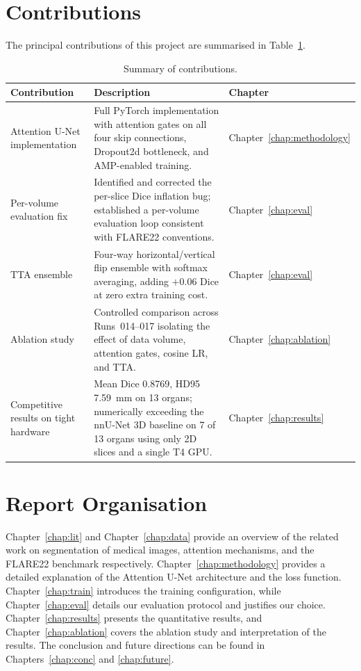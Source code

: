 \section{Contributions}

The principal contributions of this project are summarised in Table~\ref{tab:contributions}.

\begin{table}[h!]
\centering
\caption{Summary of contributions.}
\label{tab:contributions}
\begin{tabular}{p{3.5cm} p{7cm} p{2.5cm}}
\toprule
\textbf{Contribution} & \textbf{Description} & \textbf{Chapter} \\
\midrule
Attention U-Net implementation &
  Full PyTorch implementation with attention gates on all four skip connections, Dropout2d
  bottleneck, and AMP-enabled training. &
  Chapter~\ref{chap:methodology} \\[6pt]
Per-volume evaluation fix &
  Identified and corrected the per-slice Dice inflation bug; established a per-volume evaluation
  loop consistent with FLARE22 conventions. &
  Chapter~\ref{chap:eval} \\[6pt]
TTA ensemble &
  Four-way horizontal/vertical flip ensemble with softmax averaging, adding $+$0.06 Dice at zero
  extra training cost. &
  Chapter~\ref{chap:eval} \\[6pt]
Ablation study &
  Controlled comparison across Runs~014--017 isolating the effect of data volume, attention gates,
  cosine LR, and TTA. &
  Chapter~\ref{chap:ablation} \\[6pt]
Competitive results on tight hardware &
  Mean Dice 0.8769, HD95 7.59~mm on 13 organs; numerically exceeding the nnU-Net 3D baseline
  on 7 of 13 organs using only 2D slices and a single T4 GPU. &
  Chapter~\ref{chap:results} \\
\bottomrule
\end{tabular}
\end{table}

\section{Report Organisation}

Chapter~\ref{chap:lit} and Chapter~\ref{chap:data} provide an overview of the related work on segmentation of medical images, attention mechanisms, and the FLARE22 benchmark respectively. Chapter~\ref{chap:methodology} provides a detailed explanation of the Attention U-Net architecture and the loss function. Chapter~\ref{chap:train} introduces the training configuration, while Chapter~\ref{chap:eval} details our evaluation protocol and justifies our choice. Chapter~\ref{chap:results} presents the quantitative results, and Chapter~\ref{chap:ablation} covers the ablation study and interpretation of the results. The conclusion and future directions can be found in Chapters~\ref{chap:conc} and \ref{chap:future}.